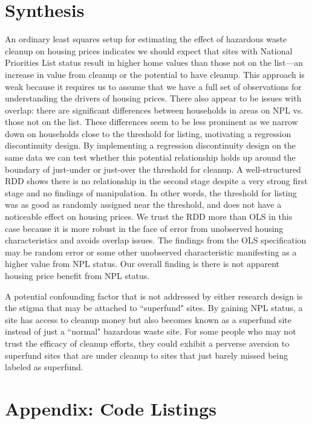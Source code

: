 \documentclass[letterpaper, 12pt]{article}
\begin{document}


\section{Synthesis}

An ordinary least squares setup for estimating the effect of hazardous waste cleanup on housing prices indicates we should expect that sites with National Priorities List status result in higher home values than those not on the list---an increase in value from cleanup or the potential to have cleanup.  This approach is weak because it requires us to assume that we have a full set of observations for understanding the drivers of housing prices.  There also appear to be issues with overlap: there are significant differences between households in areas on NPL vs. those not on the list.  These differences seem to be less prominent as we narrow down on households close to the threshold for listing, motivating a regression discontinuity design.  By implementing a regression discontinuity design on the same data we can test whether this potential relationship holds up around the boundary of just-under or just-over the threshold for cleanup.    A well-structured RDD shows there is no relationship in the second stage despite a very strong first stage and no findings of manipulation.  In other words, the threshold for listing was as good as randomly assigned near the threshold, and does not have a noticeable effect on housing prices.  We trust the RDD more than OLS in this case because it is more robust in the face of error from unobserved housing characteristics and avoids overlap issues.  The findings from the OLS specification may be random error or some other unobserved characteristic manifesting as a higher value from NPL status.  Our overall finding is there is not apparent housing price benefit from NPL status.  

A potential confounding factor that is not addressed by either research design is the stigma that may be attached to ``superfund" sites.  By gaining NPL status, a site has access to cleanup money but also becomes known as a superfund site instead of just a ``normal" bazardous waste site.  For some people who may not trust the efficacy of cleanup efforts, they could exhibit a perverse aversion to superfund sites that are under cleanup to sites that just barely missed being labeled as superfund.

\section{Appendix: Code Listings}



\end{document}
